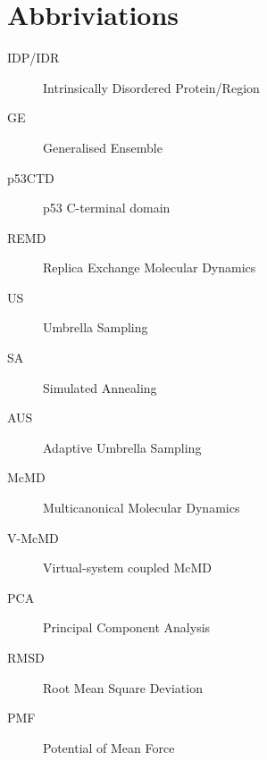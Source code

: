 \chapter*{Abbriviations}
\begin{center}
	\begin{description}
		\item[IDP/IDR] Intrinsically Disordered Protein/Region
		\item[GE] Generalised Ensemble
		\item[p53CTD] p53 C-terminal domain
		\item[REMD] Replica Exchange Molecular Dynamics
		\item[US] Umbrella Sampling
		\item[SA] Simulated Annealing
		\item[AUS] Adaptive Umbrella Sampling
		\item[McMD] Multicanonical Molecular Dynamics
		\item[V-McMD] Virtual-system coupled McMD
		\item[PCA] Principal Component Analysis
		\item[RMSD] Root Mean Square Deviation
		\item[PMF] Potential of Mean Force
	\end{description}
\end{center}
